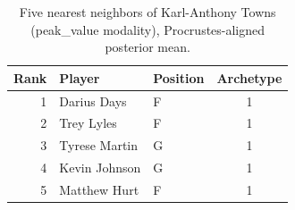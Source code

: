 \begin{table}[htbp]
  \centering\small
  \begin{tabular}{rllc}
    \toprule
    Rank & Player & Position & Archetype \\
    \midrule
    1 & Darius Days & F & 1 \\
    2 & Trey Lyles & F & 1 \\
    3 & Tyrese Martin & G & 1 \\
    4 & Kevin Johnson & G & 1 \\
    5 & Matthew Hurt & F & 1 \\
    \bottomrule
  \end{tabular}
  \caption{Five nearest neighbors of Karl-Anthony Towns (peak_value modality), Procrustes-aligned posterior mean.}
  \label{tab:Karl_Anthony_Towns_neighbors_peak_value}
\end{table}

